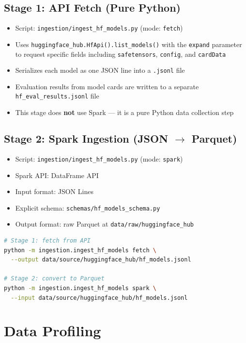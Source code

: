 \documentclass[11pt]{article}
\begin{document}
\subsection{Stage 1: API Fetch (Pure Python)}

\begin{itemize}
  \item Script: \texttt{ingestion/ingest\_hf\_models.py} (mode: \texttt{fetch})
  \item Uses \texttt{huggingface\_hub.HfApi().list\_models()} with the \texttt{expand} parameter to request specific fields including \texttt{safetensors}, \texttt{config}, and \texttt{cardData}
  \item Serializes each model as one JSON line into a \texttt{.jsonl} file
  \item Evaluation results from model cards are written to a separate \texttt{hf\_eval\_results.jsonl} file
  \item This stage does \textbf{not} use Spark --- it is a pure Python data collection step
\end{itemize}

\subsection{Stage 2: Spark Ingestion (JSON $\rightarrow$ Parquet)}

\begin{itemize}
  \item Script: \texttt{ingestion/ingest\_hf\_models.py} (mode: \texttt{spark})
  \item Spark API: DataFrame API
  \item Input format: JSON Lines
  \item Explicit schema: \texttt{schemas/hf\_models\_schema.py}
  \item Output format: raw Parquet at \texttt{data/raw/huggingface\_hub}
\end{itemize}

\begin{lstlisting}[language=bash,caption={Ingestion commands}]
# Stage 1: fetch from API
python -m ingestion.ingest_hf_models fetch \
  --output data/source/huggingface_hub/hf_models.jsonl

# Stage 2: convert to Parquet
python -m ingestion.ingest_hf_models spark \
  --input data/source/huggingface_hub/hf_models.jsonl
\end{lstlisting}

\section{Data Profiling}
\end{document}

